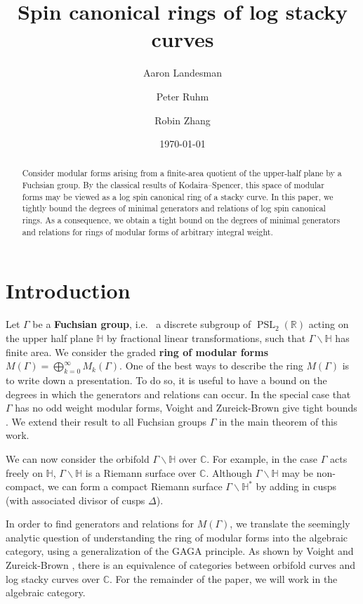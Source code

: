 \documentclass{amsart}
\title{Spin canonical rings of log stacky curves}
\author{Aaron Landesman}
\author{Peter Ruhm}
\author{Robin Zhang}
\date{\today}
\theoremstyle{plain}
\theoremstyle{definition}
\theoremstyle{remark}
\numberwithin{equation}{section}
\newcommand\BH{{\mathbb H}}
\newcommand\BC{{\mathbb C}}
\newcommand\BR{{\mathbb R}}
\newcommand{\PSL}{\operatorname{PSL}}
\begin{document}
\begin{abstract}
 	Consider modular forms arising from a finite-area quotient of the
	upper-half plane by a Fuchsian group. By the classical results of
	Kodaira--Spencer, this space of modular forms may be viewed as a
	log spin canonical ring of a stacky curve. In this paper, we
	tightly bound the degrees of minimal generators and relations of
	log spin canonical rings. As a consequence, we obtain a tight bound
	on the degrees of minimal generators and relations for rings of
	modular forms of arbitrary integral weight.
\end{abstract}

\maketitle


\section{Introduction}
Let $\Gamma$ be a {\bf Fuchsian group}, i.e.~ a discrete subgroup of
$\PSL_2(\BR)$ acting on the upper half plane $\BH$ by fractional
linear transformations, such that $\Gamma \backslash \BH$ has finite area.
We consider the graded {\bf ring of modular forms}
$M(\Gamma) = \bigoplus_{k = 0}^\infty M_k(\Gamma)$. One of the best ways to describe the ring $M(\Gamma)$ is to write down a presentation.
To do so, it is useful to have a bound on the
degrees in which the generators and relations can occur. In the
special case that $\Gamma$ has no odd weight modular forms, Voight
and Zureick-Brown give tight bounds \cite[Chapters 7-9]{vzb:stacky}.
We extend their result to all Fuchsian groups $\Gamma$ in the main
theorem of this work.

We can now consider the orbifold $\Gamma \backslash \BH$ over $\BC$.
For example, in the case $\Gamma$ acts freely on $\BH$, $\Gamma
\backslash \BH$ is a Riemann surface over $\BC$. 
Although $\Gamma \backslash \BH$ may be non-compact, we can form a
compact Riemann surface $\Gamma \backslash \BH^*$ by adding in
cusps (with associated divisor of cusps $\Delta$).

In order to find generators and relations for $M(\Gamma)$, we
translate the seemingly analytic question of understanding the ring
of modular forms into the algebraic category, using a
generalization of the GAGA principle.
As shown by Voight and Zureick-Brown \cite[Proposition 6.1.5]
{vzb:stacky}, there is an equivalence of categories between orbifold
curves and log stacky curves over $\BC$. For the remainder
of the paper, we will work in the algebraic category.
\end{document}
